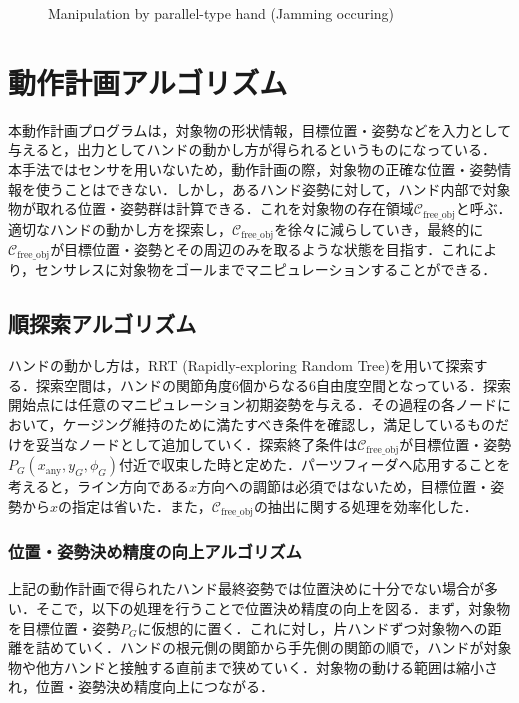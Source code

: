 \documentclass[a4paper,papersize,dvipdfmx]{mtabst}
\begin{document}
\begin{figure}[t]
\begin{minipage}{0.33\linewidth}
	\end{minipage}
	\caption{Manipulation by parallel-type hand (Jamming occuring)}\label{fig::jam}
\end{figure}


\section{動作計画アルゴリズム}
本動作計画プログラムは，対象物の形状情報，目標位置・姿勢などを入力として与えると，出力としてハンドの動かし方が得られるというものになっている．
本手法ではセンサを用いないため，動作計画の際，対象物の正確な位置・姿勢情報を使うことはできない．しかし，あるハンド姿勢に対して，ハンド内部で対象物が取れる位置・姿勢群は計算できる．これを対象物の存在領域$\mathcal{C}_{\mathrm {free\_obj}}$と呼ぶ．適切なハンドの動かし方を探索し，$\mathcal{C}_{\mathrm {free\_obj}}$を徐々に減らしていき，最終的に$\mathcal{C}_{\mathrm {free\_obj}}$が目標位置・姿勢とその周辺のみを取るような状態を目指す．これにより，センサレスに対象物をゴールまでマニピュレーションすることができる．\par 

\subsection{順探索アルゴリズム}	\label{rrt}
ハンドの動かし方は，RRT (Rapidly-exploring Random Tree)を用いて探索する．探索空間は，ハンドの関節角度6個からなる6自由度空間となっている．探索開始点には任意のマニピュレーション初期姿勢を与える．その過程の各ノードにおいて，ケージング維持のために満たすべき条件を確認し，満足しているものだけを妥当なノードとして追加していく．探索終了条件は$\mathcal{C}_{\mathrm {free\_obj}}$が目標位置・姿勢$P_G(x_{\mathrm{any}}, y_G, \phi_G )$付近で収束した時と定めた．パーツフィーダへ応用することを考えると，ライン方向である$x$方向への調節は必須ではないため，目標位置・姿勢から$x$の指定は省いた．また，$\mathcal{C}_{\mathrm {free\_obj}}$の抽出に関する処理を効率化した．

\subsubsection{位置・姿勢決め精度の向上アルゴリズム}
上記の動作計画で得られたハンド最終姿勢では位置決めに十分でない場合が多い．そこで，以下の処理を行うことで位置決め精度の向上を図る．まず，対象物を目標位置・姿勢$P_G$に仮想的に置く．これに対し，片ハンドずつ対象物への距離を詰めていく．ハンドの根元側の関節から手先側の関節の順で，ハンドが対象物や他方ハンドと接触する直前まで狭めていく．対象物の動ける範囲は縮小され，位置・姿勢決め精度向上につながる．
\end{document}
